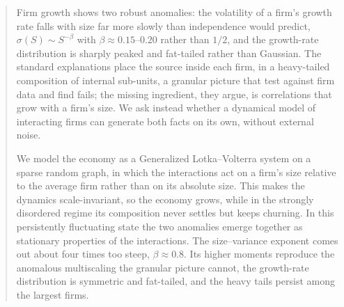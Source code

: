 \documentclass{report}
\begin{document}
\begin{abstract}
Firm growth shows two robust anomalies: the volatility of a firm's growth rate falls
with size far more slowly than independence would predict, $\sigma(S)\sim S^{-\beta}$
with $\beta\approx0.15$--$0.20$ rather than $1/2$, and the growth-rate distribution is
sharply peaked and fat-tailed rather than Gaussian. The standard explanations place the
source inside each firm, in a heavy-tailed composition of internal sub-units, a granular
picture that \citet{moran2024} test against firm data and find fails; the missing
ingredient, they argue, is correlations that grow with a firm's size. We ask instead
whether a dynamical model of interacting firms can generate both facts on its own, without
external noise.

We model the economy as a Generalized Lotka--Volterra system on a sparse random graph, in
which the interactions act on a firm's size relative to the average firm rather than on
its absolute size. This makes the dynamics
scale-invariant, so the economy grows, while in the strongly disordered regime its
composition never settles but keeps churning. In this persistently fluctuating state the
two anomalies emerge together as stationary properties of the interactions. The
size--variance exponent comes out about four times too steep, $\beta\approx0.8$. Its
higher moments reproduce the anomalous multiscaling the granular
picture cannot, the growth-rate distribution is symmetric and fat-tailed, and the heavy
tails persist among the largest firms.
\end{abstract}

\clearpage
\tableofcontents






\vspace{100pt}

\printbibliography

\appendix


\end{document}
